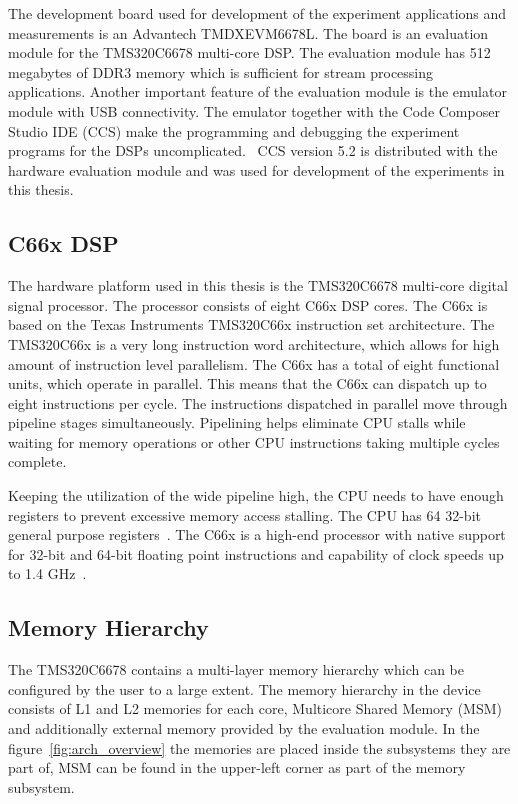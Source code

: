 The development board used for development of the experiment applications and measurements is an Advantech TMDXEVM6678L. The board is an evaluation module for the TMS320C6678 multi-core DSP. The evaluation module has 512 megabytes of DDR3 memory which is sufficient for stream processing applications. Another important feature of the evaluation module is the emulator module with USB connectivity. The emulator together with the Code Composer Studio IDE (CCS) make the programming and debugging the experiment programs for the DSPs uncomplicated.~\cite{evmref} CCS version 5.2 is distributed with the hardware evaluation module and was used for development of the experiments in this thesis.

\subsection{C66x DSP}
\label{subsec:c66x}
The hardware platform used in this thesis is the TMS320C6678 multi-core digital signal processor. The processor consists of eight C66x DSP cores. The C66x is based on the Texas Instruments TMS320C66x instruction set architecture. The TMS320C66x is a very long instruction word architecture, which allows for high amount of instruction level parallelism. The C66x has a total of eight functional units, which operate in parallel. This means that the C66x can dispatch up to eight instructions per cycle. The instructions dispatched in parallel move through pipeline stages simultaneously. Pipelining helps eliminate CPU stalls while waiting for memory operations or other CPU instructions taking multiple cycles complete.~\cite{sprugh7}

Keeping the utilization of the wide pipeline high, the CPU needs to have enough registers to prevent excessive memory access stalling. The CPU has 64 32-bit general purpose registers~\cite{sprugh7}. The C66x is a high-end processor with native support for 32-bit and 64-bit floating point instructions and capability of clock speeds up to 1.4 GHz~\cite{sprugh7}.

\subsection{Memory Hierarchy}
\label{subsec:c66memory}
The TMS320C6678 contains a multi-layer memory hierarchy which can be configured by the user to a large extent. The memory hierarchy in the device consists of L1 and L2 memories for each core, Multicore Shared Memory (MSM) and additionally external memory provided by the evaluation module. In the figure~\ref{fig:arch_overview} the memories are placed inside the subsystems they are part of, MSM can be found in the upper-left corner as part of the memory subsystem.

